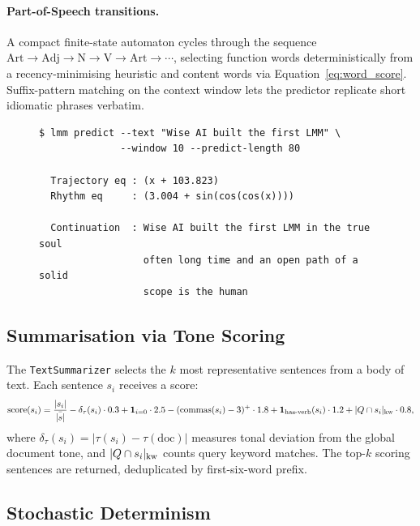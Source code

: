\documentclass[11pt,a4paper]{article}
\begin{document}
\paragraph{Part-of-Speech transitions.}
A compact finite-state automaton cycles through the sequence $\text{Art}\to\text{Adj}\to\text{N}\to\text{V}\to\text{Art}\to\cdots$, selecting function words deterministically from a recency-minimising heuristic and content words via Equation~\eqref{eq:word_score}. Suffix-pattern matching on the context window lets the predictor replicate short idiomatic phrases verbatim.

\begin{figure}[H]
\begin{lstlisting}[style=code, caption={CLI prediction example}, label={lst:predict_ex}]
$ lmm predict --text "Wise AI built the first LMM" \
              --window 10 --predict-length 80

  Trajectory eq : (x + 103.823)
  Rhythm eq     : (3.004 + sin(cos(cos(x))))

  Continuation  : Wise AI built the first LMM in the true soul
                  often long time and an open path of a solid
                  scope is the human
\end{lstlisting}
\end{figure}

\subsection{Summarisation via Tone Scoring}

The \texttt{TextSummarizer} selects the $k$ most representative sentences from a body of text. Each sentence $s_i$ receives a score:
\begin{equation}
  \text{score}(s_i) =
    \frac{|s_i|}{\bar{|s|}}
  - \delta_\tau(s_i)\cdot 0.3
  + \mathbf{1}_{i=0}\cdot 2.5
  - (\text{commas}(s_i)-3)^+\cdot 1.8
  + \mathbf{1}_{\text{has-verb}}(s_i)\cdot 1.2
  + |Q \cap s_i|_{\rm kw}\cdot 0.8,
  \label{eq:score}
\end{equation}
where $\delta_\tau(s_i) = |\tau(s_i) - \tau(\text{doc})|$ measures tonal deviation from the global document tone, and $|Q \cap s_i|_{\rm kw}$ counts query keyword matches. The top-$k$ scoring sentences are returned, deduplicated by first-six-word prefix.

\subsection{Stochastic Determinism}
\label{sec:stochastic}
\end{document}
